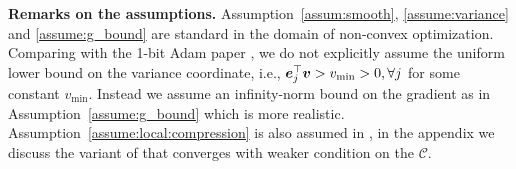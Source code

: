 \textbf{Remarks on the assumptions.}
Assumption~\ref{assum:smooth}, \ref{assume:variance} and \ref{assume:g_bound} are standard in the domain of non-convex optimization.
Comparing with the 1-bit Adam paper \citep{tang20211}, we do not explicitly assume the uniform lower bound on the variance coordinate, i.e., $\boldsymbol{e}_j^\top\boldsymbol{v}>v_{\min}>0, \forall j$ for some constant $v_{\min}$. Instead we assume an infinity-norm bound on the gradient as in Assumption~\ref{assume:g_bound} which is more realistic. Assumption~\ref{assume:local:compression} is also assumed in \citep{tang20211}, in the appendix we discuss the variant of {\myalgo} that converges with weaker condition on the $\mathcal{C}$.




